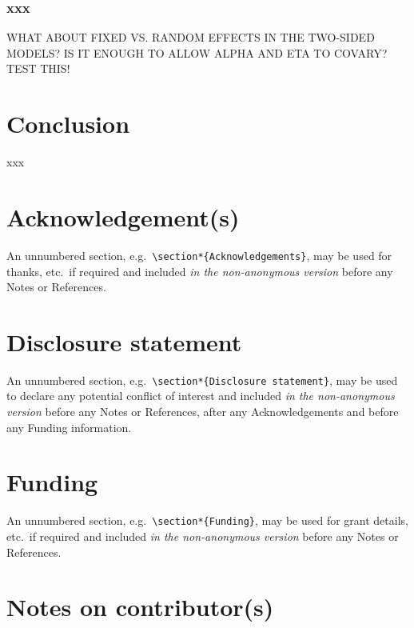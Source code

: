 \documentclass[]{interact}
\theoremstyle{plain}%
\theoremstyle{definition}
\theoremstyle{remark}
\begin{document}
\hypertarget{xxx}{%
\subsubsection{xxx}\label{xxx}}

WHAT ABOUT FIXED VS. RANDOM EFFECTS IN THE TWO-SIDED MODELS? IS IT
ENOUGH TO ALLOW ALPHA AND ETA TO COVARY? TEST THIS!

\hypertarget{conclusion}{%
\section{Conclusion}\label{conclusion}}

xxx

\hypertarget{acknowledgements}{%
\section*{Acknowledgement(s)}\label{acknowledgements}}

An unnumbered section,
e.g.~\texttt{\textbackslash{}section*\{Acknowledgements\}}, may be used
for thanks, etc.~if required and included \emph{in the non-anonymous
version} before any Notes or References.

\hypertarget{disclosure-statement}{%
\section*{Disclosure statement}\label{disclosure-statement}}

An unnumbered section,
e.g.~\texttt{\textbackslash{}section*\{Disclosure\ statement\}}, may be
used to declare any potential conflict of interest and included \emph{in
the non-anonymous version} before any Notes or References, after any
Acknowledgements and before any Funding information.

\hypertarget{funding}{%
\section*{Funding}\label{funding}}

An unnumbered section,
e.g.~\texttt{\textbackslash{}section*\{Funding\}}, may be used for grant
details, etc.~if required and included \emph{in the non-anonymous
version} before any Notes or References.

\hypertarget{notes-on-contributors}{%
\section*{Notes on contributor(s)}\label{notes-on-contributors}}
\end{document}
